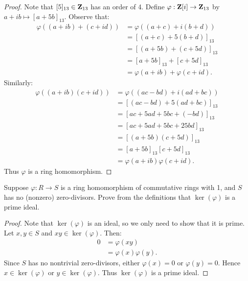 \documentclass[10pt,twoside,openany]{memoir}
\begin{document}
{\begin{proof}
        Note that $[5]_{13} \in \mathbf{Z}_{13}$ has an order of 4. Define $\varphi:\mathbf{Z}[i] \rightarrow \mathbf{Z}_{13}$ by $a+ib \mapsto [a+5b]_{13}$. Observe that:
            \begin{equation*}
            \begin{split}
                \varphi((a+ib) + (c+id))
                & = \varphi( (a+c) + i(b+d)) \\
                & = [(a+c) + 5(b+d)]_{13} \\
                & = [(a+5b) + (c+5d)]_{13} \\
                & = [a+5b]_{13} +[c+5d]_{13} \\
                & = \varphi(a+ib) + \varphi(c+id).
            \end{split}
            \end{equation*}
        Similarly:
            \begin{equation*}
            \begin{split}
                \varphi((a+ib)(c+id))
                & = \varphi((ac-bd) + i(ad+bc)) \\
                & = [(ac-bd) + 5(ad+bc)]_{13} \\
                & = [ac + 5ad + 5bc + (-bd)]_{13} \\
                & = [ac + 5ad + 5bc + 25bd]_{13} \\
                & = [(a+5b)(c+5d)]_{13} \\
                & = [a+5b]_{13}[c+5d]_{13} \\
                & = \varphi(a+ib)\varphi(c+id).
            \end{split}
            \end{equation*}
        Thus $\varphi$ is a ring homomorphism.
    \end{proof}}
\begin{problem}[F24, P3]
Suppose $\varphi:R \rightarrow S$ is a ring homomorphism of commutative rings with 1, and $S$ has no (nonzero) zero-divisors. Prove from the definitions that $\ker(\varphi)$ is a prime ideal.
\end{problem}
    {\color{blue} \begin{proof}
        Note that $\ker(\varphi)$ is an ideal, so we only need to show that it is prime. Let $x,y \in S$ and $xy \in \ker(\varphi)$. Then:
            \begin{equation*}
            \begin{split}
                0 
                & = \varphi(xy) \\
                & = \varphi(x) \varphi(y).
            \end{split}
            \end{equation*}
        Since $S$ has no nontrivial zero-divisors, either $\varphi(x) = 0$ or $\varphi(y) = 0$. Hence $x \in \ker(\varphi)$ or $y \in \ker(\varphi)$. Thus $\ker(\varphi)$ is a prime ideal.
    \end{proof}}
\end{document}
